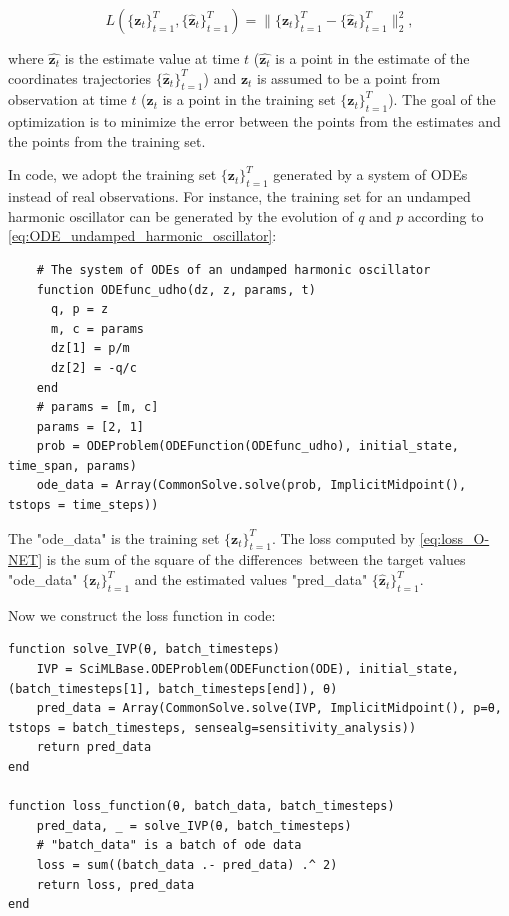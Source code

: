 \documentclass[
	parskip, 			   %
	twoside, 			   %
	DIV=14, 			   %
	BCOR=15.0mm, 		   %
	headsepline, 		   %
	open=right, 		   %
	captions=tableheading, %
	bibliography=totoc,    %
	numbers=noenddot       %
]{scrreprt}
\begin{document}
\begin{equation}
    \label{eq:loss_O-NET}
     L(\{ \mathbf{z}_{t} \}_{t=1}^{T}, \{ \mathbf{\hat{z}}_{t} \}_{t=1}^{T}) = \lVert \{ \mathbf{z}_{t} \}_{t=1}^{T} - \{ \mathbf{\hat{z}}_{t} \}_{t=1}^{T} \rVert_{2}^{2},
\end{equation}

where $\hat{\mathbf{z}_{t}}$ is the estimate value at time $t$ ($\hat{\mathbf{z}_{t}}$ is a point in the estimate of the coordinates trajectories $\{ \mathbf{\hat{z}}_{t} \}_{t=1}^{T}$) and $\mathbf{z}_{t}$ is assumed to be a point from observation at time $t$ (${\mathbf{z}_{t}}$ is a point in the training set $\{ \mathbf{z}_{t} \}_{t=1}^{T}$). The goal of the optimization is to minimize the error between the points from the estimates and the points from the training set.

In code, we adopt the training set $\{ \mathbf{z}_{t} \}_{t=1}^{T}$ generated by a system of ODEs instead of real observations. For instance, the training set for an undamped harmonic oscillator can be generated by the evolution of $q$ and $p$ according to \ref{eq:ODE_undamped_harmonic_oscillator}:

\begin{verbatim}
    # The system of ODEs of an undamped harmonic oscillator
    function ODEfunc_udho(dz, z, params, t)
      q, p = z
      m, c = params
      dz[1] = p/m
      dz[2] = -q/c
    end
    # params = [m, c]
    params = [2, 1] 
    prob = ODEProblem(ODEFunction(ODEfunc_udho), initial_state, time_span, params)
    ode_data = Array(CommonSolve.solve(prob, ImplicitMidpoint(), tstops = time_steps))
\end{verbatim}

The "ode\_data" is the training set $\{ \mathbf{z}_{t} \}_{t=1}^{T}$. The loss computed by \ref{eq:loss_O-NET} is the sum of the square of the differences between the target values "ode\_data" $\{ \mathbf{z}_{t} \}_{t=1}^{T}$ and the estimated values "pred\_data" $\{ \mathbf{\hat{z}}_{t} \}_{t=1}^{T}$.

Now we construct the loss function in code:
\begin{verbatim}
function solve_IVP(θ, batch_timesteps)
    IVP = SciMLBase.ODEProblem(ODEFunction(ODE), initial_state, (batch_timesteps[1], batch_timesteps[end]), θ)
    pred_data = Array(CommonSolve.solve(IVP, ImplicitMidpoint(), p=θ, tstops = batch_timesteps, sensealg=sensitivity_analysis))
    return pred_data
end

function loss_function(θ, batch_data, batch_timesteps)
    pred_data, _ = solve_IVP(θ, batch_timesteps)
    # "batch_data" is a batch of ode data
    loss = sum((batch_data .- pred_data) .^ 2)
    return loss, pred_data
end
\end{verbatim}
\end{document}
